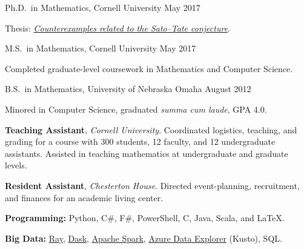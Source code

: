 \documentclass[11pt, letterpaper]{awesome-cv}
\begin{document}

\begin{cventries}

\cventry
  {Ph.D.~in Mathematics, Cornell University}
  {}{}
  {May 2017}
  {
    \begin{cvitems}
      \item{Thesis: \href{http://doi.org/10.7298/X4PN93Q3}{\emph{Counterexamples related to the Sato--Tate conjecture}}.}
    \end{cvitems}
  }
  
\cventry
  {M.S.~in Mathematics, Cornell University}
  {}{}
  {May 2017}
  {
    \begin{cvitems}
      \item{Completed graduate-level coursework in Mathematics and Computer Science.}
    \end{cvitems}
  }
  
\cventry
  {B.S.~in Mathematics, University of Nebraska Omaha}
  {}{}
  {August 2012}
  {
    \begin{cvitems}
      \item{Minored in Computer Science, graduated \emph{summa cum laude}, GPA 4.0.}
    \end{cvitems}
  }
  
\end{cventries}






\begin{cvparagraph}
\textbf{Teaching Assistant}, \emph{Cornell University}. Coordinated logistics, teaching, and grading for a course with 300 students, 12 faculty, and 12 undergraduate assistants.
Assisted in teaching mathematics at undergraduate and graduate levels.

\textbf{Resident Assistant}, \emph{Chesterton House}. Directed event-planning, recruitment, and finances for an academic living center. 
\end{cvparagraph}






\begin{cvparagraph}
\textbf{Programming:} Python, C\#, F\#, PowerShell, C, Java, Scala, and \LaTeX.

\textbf{Big Data:}
\href{https://www.ray.io/}{Ray},
\href{https://dask.org/}{Dask},
\href{https://spark.apache.org/}{Apache Spark},
\href{https://docs.microsoft.com/en-us/azure/kusto/query/index}{Azure Data Explorer} (Kusto),
SQL.
\end{cvparagraph}
\end{document}
